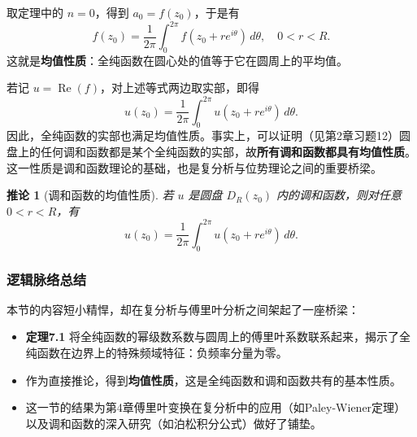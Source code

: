 \documentclass[UTF8]{ctexart}
\newtheorem{corollary}[theorem]{推论}
\numberwithin{equation}{section}
\begin{document}
取定理中的 $n=0$，得到 $a_0 = f(z_0)$，于是有
\[
f(z_0) = \frac{1}{2\pi} \int_0^{2\pi} f(z_0 + re^{i\theta})\,d\theta ,\quad 0<r<R .
\]
这就是\textbf{均值性质}：全纯函数在圆心处的值等于它在圆周上的平均值。

若记 $u = \operatorname{Re}(f)$，对上述等式两边取实部，即得
\[
u(z_0) = \frac{1}{2\pi} \int_0^{2\pi} u(z_0 + re^{i\theta})\,d\theta .
\]
因此，全纯函数的实部也满足均值性质。事实上，可以证明（见第2章习题12）圆盘上的任何调和函数都是某个全纯函数的实部，故\textbf{所有调和函数都具有均值性质}。这一性质是调和函数理论的基础，也是复分析与位势理论之间的重要桥梁。

\begin{corollary}[调和函数的均值性质]
若 $u$ 是圆盘 $D_R(z_0)$ 内的调和函数，则对任意 $0<r<R$，有
\[
u(z_0) = \frac{1}{2\pi} \int_0^{2\pi} u(z_0 + re^{i\theta})\,d\theta .
\]
\end{corollary}

\subsubsection{逻辑脉络总结}

本节的内容短小精悍，却在复分析与傅里叶分析之间架起了一座桥梁：

\begin{itemize}
    \item \textbf{定理7.1} 将全纯函数的幂级数系数与圆周上的傅里叶系数联系起来，揭示了全纯函数在边界上的特殊频域特征：负频率分量为零。
    \item 作为直接推论，得到\textbf{均值性质}，这是全纯函数和调和函数共有的基本性质。
    \item 这一节的结果为第4章傅里叶变换在复分析中的应用（如Paley-Wiener定理）以及调和函数的深入研究（如泊松积分公式）做好了铺垫。
\end{itemize}
\end{document}
